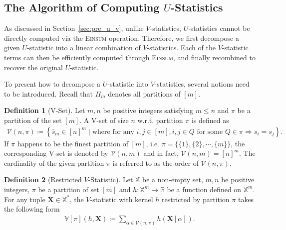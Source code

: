 \documentclass[sn-mathphys, natbib=false]{sn-jnl}
\newcommand{\pdfu}{\texorpdfstring{$U$}{U}}
\theoremstyle{plain}
\theoremstyle{definition}
\newtheorem{definition}{Definition}
\def\Einsum{\textsc{Einsum}}
\newcommand{\sPi}{\pi}
\newcommand{\vset}{\calV}
\newcommand{\vsetp}[2]{\vset(#1,#2)}
\newcommand{\vstat}{\mathbb{V}}
\newcommand{\partition}{\Pi}
\newcommand{\partitionp}[1]{\partition_{#1}}
\newcommand{\bbR}{{\mathbb{R}}}
\def\bbX{\mathbb{X}}
\def\calV{\mathcal{V}}
\begin{document}
\begin{bibunit}[agsm]
\subsection{The Algorithm of Computing \pdfu{}-Statistics}
\label{sec:alg_u}

As discussed in Section~\ref{sec:pre_u_v}, unlike $V$-statistics, $U$-statistics cannot be directly computed via the \Einsum{} operation. Therefore, we first decompose a given $U$-statistic into a linear combination of $V$-statistics. Each of the $V$-statistic terms can then be efficiently computed through \Einsum{}, and finally recombined to recover the original $U$-statistic.

To present how to decompose a $U$-statistic into $V$-statistics, several notions need to be introduced. Recall that $\partitionp{m}$ denotes all partitions of $[m]$. %

\begin{definition}[V-Set]\label{def:v_set}
     Let $m,n$ be positive integers satisfying $m \leq n$ and $\sPi$ be a partition of the set $[m]$. A V-set of size $n$ w.r.t. partition $\sPi$ is defined as
    \begin{align*}
        \vsetp{n}{\sPi} \coloneqq \left\{ \bar{s}_{m} \in [n]^m \mid \text{where for any $i, j \in [m]$},i, j \in Q \text{ for some $Q \in \sPi$}  \Longrightarrow  s_i = s_j \right\}.
    \end{align*}
    If $\sPi$ happens to be the finest partition of $[m]$, i.e. $\sPi = \{\{1\}, \{2\}, \cdots, \{m\}\}$, the corresponding V-set is denoted by $\vsetp{n}{m}$ and in fact, $\vsetp{n}{m} = [n]^m$. The cardinality of the given partition $\sPi$ is referred to as the order of $\vsetp{n}{\sPi}$.
\end{definition}

\begin{definition}[Restricted $V$-Statistic]\label{def:res_v_stat}
Let $\bbX$ be a non-empty set, $m, n$ be positive integers, $\sPi$ be a partition of set $[m]$ and $h: \bbX^{m} \rightarrow \bbR$ be a function defined on $\bbX^m$. For any tuple $\bm{X} \in \bbX^*$, the $V$-statistic with kernel $h$ restricted by partition $\sPi$ takes the following form 
\begin{align*}
\vstat[\sPi](h,\bm{X}) \coloneqq \sum_{\alpha \in \vsetp{n}{\sPi}} h(\bm{X}[\alpha]). 
\end{align*}
\end{definition}


\end{bibunit}
\end{document}
